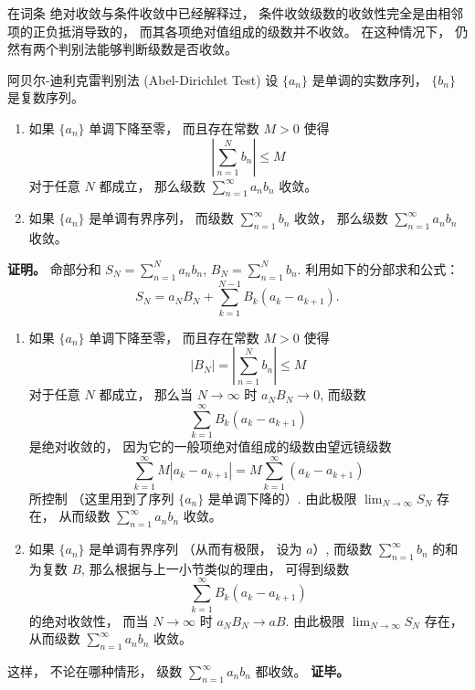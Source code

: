 

在词条 绝对收敛与条件收敛中已经解释过， 条件收敛级数的收敛性完全是由相邻项的正负抵消导致的， 而其各项绝对值组成的级数并不收敛。 在这种情况下， 仍然有两个判别法能够判断级数是否收敛。

\begin{theorem}{阿贝尔-迪利克雷判别法 (Abel-Dirichlet Test)}
设 $\{a_n\}$ 是单调的实数序列， $\{b_n\}$ 是复数序列。

\begin{enumerate}
\item 如果 $\{a_n\}$ 单调下降至零， 而且存在常数 $M>0$ 使得
$$
\left|\sum_{n=1}^N b_n\right|\leq M
$$
对于任意 $N$ 都成立， 那么级数 $\sum_{n=1}^\infty a_nb_n$ 收敛。

\item 如果 $\{a_n\}$ 是单调有界序列， 而级数 $\sum_{n=1}^\infty b_n$ 收敛， 那么级数 $\sum_{n=1}^\infty a_nb_n$ 收敛。
\end{enumerate}
\end{theorem}

\textbf{证明。} 命部分和 $S_N=\sum_{n=1}^N a_nb_n$, $B_N=\sum_{n=1}^N b_n$. 利用如下的分部求和公式：
$$
S_N=a_NB_N+\sum_{k=1}^{N-1}B_k(a_{k}-a_{k+1}).
$$

\begin{enumerate}
\item 如果 $\{a_n\}$ 单调下降至零， 而且存在常数 $M>0$ 使得
$$
|B_N|=\left|\sum_{n=1}^N b_n\right|\leq M
$$
对于任意 $N$ 都成立， 那么当 $N\to\infty$ 时 $a_NB_N\to0$, 而级数
$$
\sum_{k=1}^{\infty}B_k(a_{k}-a_{k+1})
$$
是绝对收敛的， 因为它的一般项绝对值组成的级数由望远镜级数
$$
\sum_{k=1}^{\infty}M|a_{k}-a_{k+1}|
=M\sum_{k=1}^{\infty}(a_{k}-a_{k+1})
$$
所控制 （这里用到了序列 $\{a_n\}$ 是单调下降的）. 由此极限 $\lim_{N\to\infty}S_N$ 存在， 从而级数 $\sum_{n=1}^\infty a_nb_n$ 收敛。

\item 如果 $\{a_n\}$ 是单调有界序列 （从而有极限， 设为 $a$）, 而级数 $\sum_{n=1}^\infty b_n$ 的和为复数 $B$, 那么根据与上一小节类似的理由， 可得到级数
$$
\sum_{k=1}^{\infty}B_k(a_{k}-a_{k+1})
$$
的绝对收敛性， 而当 $N\to\infty$ 时 $a_NB_N\to aB$. 由此极限 $\lim_{N\to\infty}S_N$ 存在， 从而级数 $\sum_{n=1}^\infty a_nb_n$ 收敛。
\end{enumerate}
这样， 不论在哪种情形， 级数 $\sum_{n=1}^\infty a_nb_n$ 都收敛。 \textbf{证毕。}

